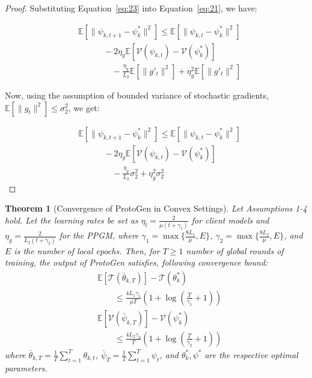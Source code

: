 \documentclass[lettersize,journal]{IEEEtran}
\newtheorem{theorem}{Theorem}
\newtheorem{proof}{Proof}
\begin{document}
\begin{proof}
Substituting Equation~\ref{eq:23} into Equation~\ref{eq:21}, we have:

\begin{align*}
&\mathbb{E}[\|\psi_{k,t+1} - \psi_k^*\|^2] \leq \mathbb{E}[\|\psi_{k,t} - \psi_k^*\|^2]\\
&\qquad\quad- 2\eta_g \mathbb{E}[\mathcal{V}(\psi_{k,t})- \mathcal{V}(\psi_k^*)]\\ 
&\qquad \qquad- \frac{\eta_g }{L_2}\mathbb{E}[\|g'_t\|^2]+ \eta_g^2 \mathbb{E}[\|g'_t\|^2]
\end{align*}

Now, using the assumption of bounded variance of stochastic gradients, $\mathbb{E}[\|g_t\|^2] \leq \sigma_2^2$, we get:

\begin{align*}
&\mathbb{E}[\|\psi_{k,t+1} - \psi_k^*\|^2] \leq \mathbb{E}[\|\psi_{k,t} - \psi_k^*\|^2]\\
&\qquad\quad- 2\eta_g \mathbb{E}[\mathcal{V}(\psi_{k,t})- \mathcal{V}(\psi_k^*)]\\ 
&\qquad\qquad - \frac{\eta_g}{L_2} \sigma_2^2 + \eta_g^2 \sigma_2^2
\end{align*}

\end{proof}

\begin{theorem}[Convergence of \textsf{ProtoGen} in Convex Settings]
\label{theo:1}
Let Assumptions 1-4 hold. Let the learning rates be set as $\eta_l = \frac{2}{\mu(t+\gamma_1)}$ for client models and $\eta_g = \frac{2}{L_2(t+\gamma_2)}$ for the \emph{PPGM}, where $\gamma_1 = \max\{\frac{8L_1}{\mu}, E\}$, $\gamma_2 = \max\{\frac{8L_2}{\mu}, E\}$, and $E$ is the number of local epochs. Then, for $T \geq 1$ number of global rounds of training, the output of \textsf{ProtoGen} satisfies, following convergence bound:
\begin{equation}
\begin{split}
    &\mathbb{E}[\mathcal{T}(\bar{\theta}_{k,T})] - \mathcal{T}(\theta_k^*)\\ 
    &\qquad \leq \frac{4L_1\gamma_1}{\mu T}\left(1 + \log\left(\frac{T}{\gamma_1} + 1\right)\right)
\end{split}
\end{equation}
\begin{equation}
\begin{split}
    &\mathbb{E}[\mathcal{V}(\bar{\psi}_{k,T})] - \mathcal{V}(\psi_k^*)\\ 
    & \qquad \leq \frac{4L_2\gamma_2}{T}\left(1 + \log\left(\frac{T}{\gamma_2} + 1\right)\right)
\end{split}
\end{equation}
where $\bar{\theta}_{k,T} = \frac{1}{T}\sum_{t=1}^T \theta_{k,t}$, $\bar{\psi}_T = \frac{1}{T}\sum_{t=1}^T \psi_t$, and $\theta_k^*, \psi^*$ are the respective optimal parameters.
\end{theorem}
\end{document}
